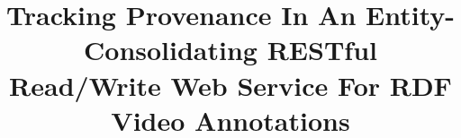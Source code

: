 \documentclass{acm_proc_article-sp}
\begin{document}
\title{Tracking Provenance In An Entity-Consolidating RESTful Read/Write Web Service For RDF Video Annotations}
%
%
%
%
%
\end{document}
